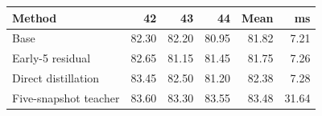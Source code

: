 \begin{tabular}{lrrrrr}
\toprule
Method & 42 & 43 & 44 & Mean & ms \\
\midrule
Base & 82.30 & 82.20 & 80.95 & 81.82 & 7.21 \\
Early-5 residual & 82.65 & 81.15 & 81.45 & 81.75 & 7.26 \\
Direct distillation & 83.45 & 82.50 & 81.20 & 82.38 & 7.28 \\
Five-snapshot teacher & 83.60 & 83.30 & 83.55 & 83.48 & 31.64 \\
\bottomrule
\end{tabular}
